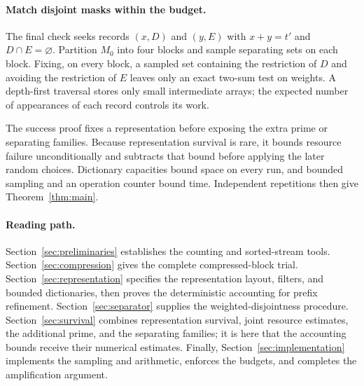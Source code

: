 \paragraph{Match disjoint masks within the budget.}
The final check seeks records $(x,D)$ and $(y,E)$ with
$x+y=t'$ and $D\cap E=\varnothing$. Partition $M_0$ into four
blocks and sample separating sets on each block. Fixing, on every
block, a sampled set containing the restriction of $D$ and avoiding the
restriction of $E$ leaves only an exact two-sum test on weights.
A depth-first traversal stores only
small intermediate arrays; the expected number of appearances of each
record controls its work.

The success proof fixes a representation before exposing the extra
prime or separating families. Because representation survival is rare,
it bounds resource failure unconditionally and subtracts that bound
before applying the later random choices. Dictionary capacities bound
space on every run, and bounded sampling and an operation counter
bound time. Independent repetitions then give Theorem~\ref{thm:main}.

\paragraph{Reading path.}
Section~\ref{sec:preliminaries} establishes the counting and sorted-stream
tools. Section~\ref{sec:compression} gives the complete compressed-block
trial. Section~\ref{sec:representation} specifies the representation layout,
filters, and bounded dictionaries, then proves the deterministic accounting
for prefix refinement. Section~\ref{sec:separator} supplies the
weighted-disjointness procedure. Section~\ref{sec:survival} combines
representation survival, joint resource estimates,
the additional prime, and the separating families; it is here that
the accounting bounds receive their numerical estimates.
Finally, Section~\ref{sec:implementation} implements the sampling and arithmetic, enforces
the budgets, and completes the amplification argument.
